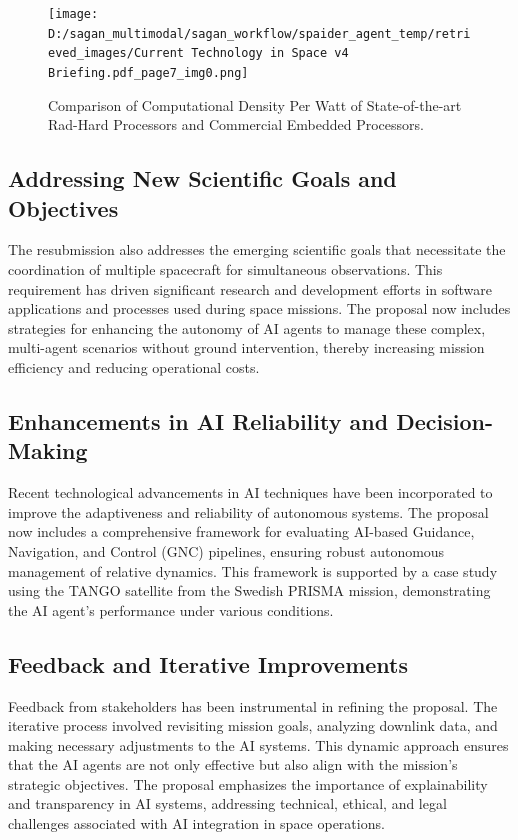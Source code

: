 \documentclass[a4paper, 11pt]{article}
\begin{document}
\begin{figure}[htbp]
    \centering
    \texttt{[image: D:/sagan\_multimodal/sagan\_workflow/spaider\_agent\_temp/retrieved\_images/Current Technology in Space v4 Briefing.pdf\_page7\_img0.png]}
    \caption{Comparison of Computational Density Per Watt of State-of-the-art Rad-Hard Processors and Commercial Embedded Processors.}
    \label{fig:comp_density}
\end{figure}

\subsection{Addressing New Scientific Goals and Objectives}

The resubmission also addresses the emerging scientific goals that necessitate the coordination of multiple spacecraft for simultaneous observations. This requirement has driven significant research and development efforts in software applications and processes used during space missions. The proposal now includes strategies for enhancing the autonomy of AI agents to manage these complex, multi-agent scenarios without ground intervention, thereby increasing mission efficiency and reducing operational costs.

\subsection{Enhancements in AI Reliability and Decision-Making}

Recent technological advancements in AI techniques have been incorporated to improve the adaptiveness and reliability of autonomous systems. The proposal now includes a comprehensive framework for evaluating AI-based Guidance, Navigation, and Control (GNC) pipelines, ensuring robust autonomous management of relative dynamics. This framework is supported by a case study using the TANGO satellite from the Swedish PRISMA mission, demonstrating the AI agent's performance under various conditions.

\subsection{Feedback and Iterative Improvements}

Feedback from stakeholders has been instrumental in refining the proposal. The iterative process involved revisiting mission goals, analyzing downlink data, and making necessary adjustments to the AI systems. This dynamic approach ensures that the AI agents are not only effective but also align with the mission's strategic objectives. The proposal emphasizes the importance of explainability and transparency in AI systems, addressing technical, ethical, and legal challenges associated with AI integration in space operations.
\end{document}
